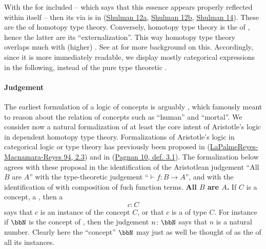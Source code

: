 With the  for   included -- which says that this essence appears properly reflected within itself -- then its  via  is in   (\hyperlink{Shulman12a}{Shulman 12a}, \hyperlink{Shulman12b}{Shulman 12b}, \hyperlink{Shulman14}{Shulman 14}). These are the  of homotopy type theory. Conversely, homotopy type theory is the  of , hence the latter are its ``externalization''. This way homotopy type theory overlaps much with (higher) . See at  for more background on this.
Accordingly, since it is more immediately readable, we display mostly categorical expressions in the following, instead of the pure type theoretic .
\hypertarget{JudgementInFormalization}{}\paragraph*{{Judgement}}\label{JudgementInFormalization}
The earliest formulation of a logic of concepts is arguably , which famously meant to reason about the relation of concepts such as ``human'' and ``mortal''. We consider now a natural formalization of at least the core intent of Aristotle's logic in dependent homotopy type theory.
Formalizations of Aristotle's logic in categorical logic or type theory has previously been proposed in (\hyperlink{PalmeReyesMacnamaraReyes94}{LaPalmeReyes-Macnamara-Reyes 94, 2.3}) and in (\hyperlink{Pagnan10}{Pagnan 10, def. 3.1}). The formalization below agrees with these proposal in the identification of the Aristotlean judgement ``All $B$ are $A$'' with the type-theoretic judgement ``$\vdash f \colon B\to A$'', and with the identification of  with composition of fuch function terms.
\textbf{All $B$ are $A$.}
If $C$ is a concept, a , then a 
\begin{displaymath}
c \colon C
\end{displaymath}
says that $c$ is an instance of the concept $C$, or that $c$ is a  of type $C$.
For instance if $\bbN$ is the concept of , then the judgement $n \colon \bbN$ says that $n$ is a natural number. Clearly here the ``concept'' $\bbN$ may just as well be thought of as the  of all its instances.
